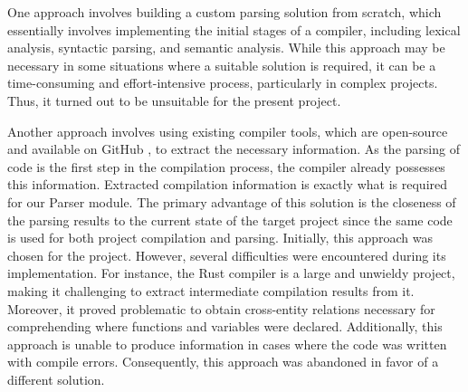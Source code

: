 


One approach involves building a custom parsing solution from scratch, which essentially involves implementing the initial stages of a compiler, including lexical analysis, syntactic parsing, and semantic analysis. While this approach may be necessary in some situations where a suitable solution is required, it can be a time-consuming and effort-intensive process, particularly in complex projects. Thus, it turned out to be unsuitable for the present project.

Another approach involves using existing compiler tools, which are open-source and available on GitHub \cite{rust-github}, to extract the necessary information. As the parsing of code is the first step in the compilation process, the compiler already possesses this information. Extracted compilation information is exactly what is required for our Parser module. The primary advantage of this solution is the closeness of the parsing results to the current state of the target project since the same code is used for both project compilation and parsing. Initially, this approach was chosen for the project. However, several difficulties were encountered during its implementation. For instance, the Rust compiler is a large and unwieldy project, making it challenging to extract intermediate compilation results from it. Moreover, it proved problematic to obtain cross-entity relations necessary for comprehending where functions and variables were declared. Additionally, this approach is unable to produce information in cases where the code was written with compile errors. Consequently, this approach was abandoned in favor of a different solution.

